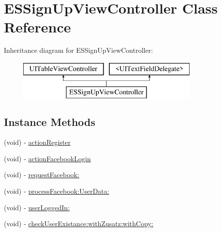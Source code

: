 \hypertarget{interface_e_s_sign_up_view_controller}{}\section{E\+S\+Sign\+Up\+View\+Controller Class Reference}
\label{interface_e_s_sign_up_view_controller}
Inheritance diagram for E\+S\+Sign\+Up\+View\+Controller\+:\begin{figure}[H]
\begin{center}
\leavevmode
\includegraphics[height=2.000000cm]{interface_e_s_sign_up_view_controller}
\end{center}
\end{figure}
\subsection*{Instance Methods}
\begin{DoxyCompactItemize}
\item 
(void) -\/ \hyperlink{interface_e_s_sign_up_view_controller_a60ce3d503b1f017d5816957f474390ab}{action\+Register}
\item 
(void) -\/ \hyperlink{interface_e_s_sign_up_view_controller_adf3713dc1173e5069875ec5134ca9a5d}{action\+Facebook\+Login}
\item 
(void) -\/ \hyperlink{interface_e_s_sign_up_view_controller_abb2498f0be01352c2658439cf2b17fbc}{request\+Facebook\+:}
\item 
(void) -\/ \hyperlink{interface_e_s_sign_up_view_controller_aba64e08908f75af9bcdae60b3f1ab696}{process\+Facebook\+:\+User\+Data\+:}
\item 
(void) -\/ \hyperlink{interface_e_s_sign_up_view_controller_a5ed671ccf157c0a7c7ed8fc5b52f57d3}{user\+Logged\+In\+:}
\item 
(void) -\/ \hyperlink{interface_e_s_sign_up_view_controller_a283ccdc079b0abb6ee5bd2bf601d96b8}{check\+User\+Existance\+:with\+Zusatz\+:with\+Copy\+:}
\end{DoxyCompactItemize}
